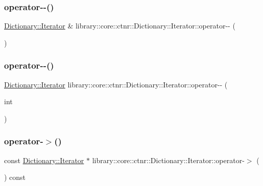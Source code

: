 \subsubsection{\texorpdfstring{operator-\/-\/()}{operator--()}\hspace{0.1cm}{\footnotesize\ttfamily [1/2]}}
{\footnotesize\ttfamily \hyperlink{classlibrary_1_1core_1_1ctnr_1_1_dictionary_1_1_iterator}{Dictionary\+::\+Iterator} \& library\+::core\+::ctnr\+::\+Dictionary\+::\+Iterator\+::operator-\/-\/ (\begin{DoxyParamCaption}{ }\end{DoxyParamCaption})}

\mbox{\label{classlibrary_1_1core_1_1ctnr_1_1_dictionary_1_1_iterator_ab203c310eee79909f5288116a41b93eb}} 
\subsubsection{\texorpdfstring{operator-\/-\/()}{operator--()}\hspace{0.1cm}{\footnotesize\ttfamily [2/2]}}
{\footnotesize\ttfamily \hyperlink{classlibrary_1_1core_1_1ctnr_1_1_dictionary_1_1_iterator}{Dictionary\+::\+Iterator} library\+::core\+::ctnr\+::\+Dictionary\+::\+Iterator\+::operator-\/-\/ (\begin{DoxyParamCaption}\item[{int}]{ }\end{DoxyParamCaption})}

\mbox{\label{classlibrary_1_1core_1_1ctnr_1_1_dictionary_1_1_iterator_a4cf579b2530dcdf5e44ed0b10034aa23}} 
\subsubsection{\texorpdfstring{operator-\/$>$()}{operator->()}\hspace{0.1cm}{\footnotesize\ttfamily [1/2]}}
{\footnotesize\ttfamily const \hyperlink{classlibrary_1_1core_1_1ctnr_1_1_dictionary_1_1_iterator}{Dictionary\+::\+Iterator} $\ast$ library\+::core\+::ctnr\+::\+Dictionary\+::\+Iterator\+::operator-\/$>$ (\begin{DoxyParamCaption}{ }\end{DoxyParamCaption}) const}

